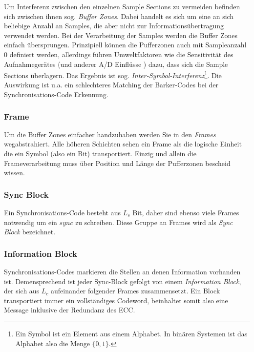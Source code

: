Um Interferenz zwischen den einzelnen Sample Sections zu vermeiden befinden sich zwischen ihnen sog. \textit{Buffer Zones}. Dabei handelt es sich um eine an sich beliebige Anzahl an Samples, die aber nicht zur Informationsübertragung verwendet werden. Bei der Verarbeitung der Samples werden die Buffer Zones einfach übersprungen. Prinzipiell können die Pufferzonen auch mit Sampleanzahl 0 definiert werden, allerdings führen Umweltfaktoren wie die Sensitivität des Aufnahmegerätes (und anderer A/D Einflüsse ) dazu, dass sich die Sample Sections überlagern\cite{chang2012location}. Das Ergebnis ist sog. \textit{Inter-Symbol-Interferenz}\footnote{Ein Symbol ist ein Element aus einem Alphabet. In binären Systemen ist das Alphabet also die Menge $\{0,1\}$.}. Die Auswirkung ist u.a. ein schlechteres Matching der Barker-Codes bei der Synchronisations-Code Erkennung.

\subsubsection{Frame}

Um die Buffer Zones einfacher handzuhaben werden Sie in den \textit{Frames} wegabstrahiert. Alle höheren Schichten sehen ein Frame als die logische Einheit die ein Symbol (also ein Bit) transportiert. Einzig und allein die Frameverarbeitung muss über Position und Länge der Pufferzonen bescheid wissen.

\subsubsection{Sync Block}

Ein Synchronisations-Code besteht aus $L_s$ Bit, daher sind ebenso viele Frames notwendig um ein $sync$ zu schreiben. Diese Gruppe an Frames wird als \textit{Sync Block} bezeichnet.

\subsubsection{Information Block}
 
Synchronisations-Codes markieren die Stellen an denen Information vorhanden ist. Demensprechend ist jeder Sync-Block gefolgt von einem \textit{Information Block}, der sich aus $L_c$ aufeinander folgender Frames zusammensetzt. Ein Block transportiert immer ein vollständiges Codeword, beinhaltet somit also eine Message inklusive der Redundanz des ECC.

